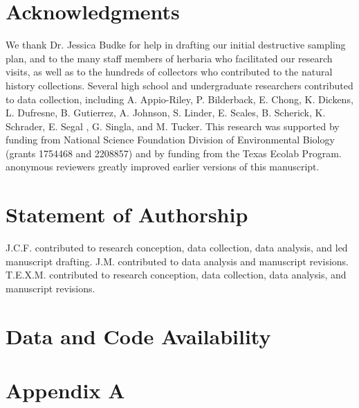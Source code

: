 \documentclass[11pt]{article}
\newcommand{\secondrevise}[1]{{\color{black}{#1}}}
\begin{document}
	\section*{Acknowledgments}
	We thank Dr. Jessica Budke for help in drafting our initial destructive sampling plan, and to the many staff members of herbaria who facilitated our research visits, as well as to the hundreds of collectors who contributed to the natural history collections. 
	Several high school and undergraduate researchers contributed to data collection, including A. Appio-Riley, P. Bilderback, E. Chong, K. Dickens, L. Dufresne, B. Gutierrez, A. Johnson, S. Linder, E. Scales, B. Scherick, K. Schrader, E. Segal , G. Singla, and M. Tucker.
	This research was supported by funding from National Science Foundation Division of Environmental Biology (grants 1754468 and 2208857) and by funding from the Texas Ecolab Program.
	\secondrevise{Five} anonymous reviewers greatly improved earlier versions of this manuscript.


	
	\section*{Statement of Authorship}
J.C.F. contributed to research conception, data collection, data analysis, and led manuscript drafting.
J.M. contributed to data analysis and manuscript revisions.
T.E.X.M. contributed to research conception, data collection, data analysis, and manuscript revisions.

	
	\section*{Data and Code Availability}
\newpage{}
	
	
	
\newpage{}


	\section*{Appendix A}
	
\end{document}
